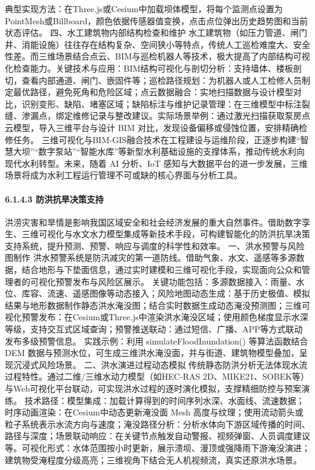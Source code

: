 {典型实现方法：在Three.js或Cesium中加载坝体模型，将每个监测点设置为PointMesh或Billboard，颜色依据传感器值变换，点击点位弹出历史趋势图和当前状态评估。 四、水工建筑物内部结构检查和维护
水工建筑物（如压力管道、闸门井、消能设施）往往存在结构复杂、空间狭小等特点，传统人工巡检难度大、安全性差。而三维场景结合点云、BIM与巡检机器人等技术，极大提高了内部结构可视化检查能力。关键技术与应用：BIM结构可视化与剖切分析：支持墙体、楼板剖切，查看内部通道、闸门、嵌固件等；巡检路径规划：为机器人或人工检修人员制定最优路径，避免死角和危险区域；点云数据融合：实地扫描数据与设计模型对比，识别变形、缺陷、堵塞区域；缺陷标注与维护记录管理：在三维模型中标注裂缝、渗漏点，绑定维修记录与整改建议。实际场景举例：通过激光扫描获取泵房点云模型，导入三维平台与设计
BIM 对比，发现设备偏移或侵蚀位置，安排精确检修任务。 三维可视化与BIM-GIS融合技术在工程建设与运维阶段，正逐步构建``智慧大坝''``数字泵站''``智能水库''等新型水利基础设施的支撑体系，推动传统水利向现代水利转型。未来，随着
AI 分析、IoT 感知与大数据平台的进一步发展，三维场景将成为水利工程运行管理不可或缺的核心界面与分析工具。 \paragraph{6.1.4.3
防洪抗旱决策支持}\label{ux9632ux6d2aux6297ux65f1ux51b3ux7b56ux652fux6301}
洪涝灾害和旱情是影响我国区域安全和社会经济发展的重大自然事件。借助数字孪生、三维可视化与水文水力模型集成等新技术手段，可构建智能化的防洪抗旱决策支持系统，提升预测、预警、响应与调度的科学性和效率。 一、洪水预警与风险图制作
洪水预警系统是防汛减灾的第一道防线。借助气象、水文、遥感等多源数据，结合地形与下垫面信息，通过实时建模和三维可视化手段，实现面向公众和管理者的可视化预警发布与风险区展示。
关键功能包括：多源数据接入：雨量、水位、库容、流速、遥感图像等动态接入；风险地图动态生成：基于历史极值、模拟结果与地形数据制作静态洪水淹没图；结合实时数据生成动态淹没预测图；三维可视化预警发布：在Cesium或Three.js中渲染洪水淹没区域；使用颜色梯度显示水深等级，支持交互式区域查询；预警推送联动：通过短信、广播、APP等方式联动发布多级预警信息。
实践示例：利用 simulateFloodInundation() 等算法函数结合 DEM 数据与预测水位，可生成三维洪水淹没面，并与街道、建筑物模型叠加，呈现沉浸式风险场景。 二、洪水演进过程动态模拟
传统静态防洪分析无法体现水流过程特性。通过二维/三维水动力模型（如HEC-RAS 2D、MIKE21、SOBEK等）与Web可视化平台联动，可实现洪水过程的逐时演化模拟，支撑精细防控与预案演练。
技术路径：模型集成：加载计算得到的时间序列水深、水面线、流速数据；时序动画渲染：在Cesium中动态更新淹没面 Mesh
高度与纹理；使用流动箭头或粒子系统表示水流方向与速度；淹没路径分析：分析水体向下游区域传播的时间、路径与深度；场景联动响应：在关键节点触发自动警报、视频弹窗、人员调度建议等。可视化形式：水体范围按小时更新，展示溃坝、漫顶或强降雨下游淹没演进；建筑物受淹程度分级高亮；三维视角下结合无人机视频流，真实还原洪水场景。
}
